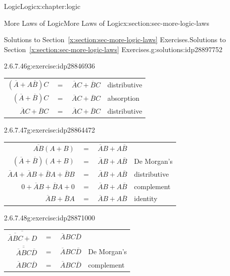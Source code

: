 \documentclass[twoside,10pt,]{book}
\newcommand{\tabularfont}{\relax}
\newcommand{\xreffont}{\relax}
\numberwithin{equation}{section}
\begin{document}
\begin{chapterptx}{Logic}{}{Logic}{}{}{x:chapter:logic}
\begin{sectionptx}{More Laws of Logic}{}{More Laws of Logic}{}{}{x:section:sec-more-logic-laws}
\begin{solutions-subsection}{Solutions to Section~{\xreffont\ref*{x:section:sec-more-logic-laws}} Exercises.}{}{Solutions to Section~{\xreffont\ref*{x:section:sec-more-logic-laws}} Exercises.}{}{}{g:solutions:idp28897752}
\begin{exercisegroup}
\begin{divisionsolutioneg}{2.6.7.46}{}{g:exercise:idp28846936}
\begin{center}
{\begin{tabular}{llll}
\multicolumn{1}{r}{\((\overline{A}{}+A\overline{B}{})C\)}&\(=\)&\(\overline{A}{}C+\overline{B}{}C\)&distributive\tabularnewline[0pt]
\multicolumn{1}{r}{\((\overline{A}{}+\overline{B}{})C\)}&\(=\)&\(\overline{A}{}C+\overline{B}{}C\)&absorption\tabularnewline[0pt]
\multicolumn{1}{r}{\(\overline{A}{}C+\overline{B}{}C\)}&\(=\)&\(\overline{A}{}C+\overline{B}{}C\)&distributive
\end{tabular}
}%
\end{center}%
\end{divisionsolutioneg}%
\begin{divisionsolutioneg}{2.6.7.47}{}{g:exercise:idp28864472}%
\par\smallskip%
\noindent\hypertarget{g:solution:idp28862296-main}{}\begin{center}%
{\tabularfont%
\begin{tabular}{llll}
\multicolumn{1}{r}{\(\overline{AB}(A+B)\)}&\(=\)&\(\overline{A}{}B+A\overline{B}{}\)&\tabularnewline[0pt]
\multicolumn{1}{r}{\((\overline{A}{}+\overline{B}{})(A+B)\)}&\(=\)&\(\overline{A}{}B+A\overline{B}{}\)&De Morgan's\tabularnewline[0pt]
\multicolumn{1}{r}{\(\overline{A}{}A+\overline{A}{}B+\overline{B}{}A+\overline{B}{}B\)}&\(=\)&\(\overline{A}{}B+A\overline{B}{}\)&distributive\tabularnewline[0pt]
\multicolumn{1}{r}{\(0+\overline{A}{}B+\overline{B}{}A+0\)}&\(=\)&\(\overline{A}{}B+A\overline{B}{}\)&complement\tabularnewline[0pt]
\multicolumn{1}{r}{\(\overline{A}{}B+\overline{B}{}A\)}&\(=\)&\(\overline{A}{}B+A\overline{B}{}\)&identity
\end{tabular}
}%
\end{center}%
\end{divisionsolutioneg}%
\begin{divisionsolutioneg}{2.6.7.48}{}{g:exercise:idp28871000}%
\par\smallskip%
\noindent\hypertarget{g:solution:idp28874456-main}{}\begin{center}%
{\tabularfont%
\begin{tabular}{llll}
\multicolumn{1}{r}{\(\overline{\overline{\overline{A}{}BC}+D}\)}&\(=\)&\(\overline{A}{}BC\overline{D}\)&\tabularnewline[0pt]
\multicolumn{1}{r}{\(\overline{\overline{\overline{A}{}BC}}\overline{D}\)}&\(=\)&\(\overline{A}{}BC\overline{D}\)&De Morgan's\tabularnewline[0pt]
\multicolumn{1}{r}{\(\overline{A}{}BC\overline{D}\)}&\(=\)&\(\overline{A}{}BC\overline{D}\)&complement
\end{tabular}
}%
\end{center}%
\end{divisionsolutioneg}%

\end{exercisegroup}
\end{solutions-subsection}
\end{sectionptx}
\end{chapterptx}
\end{document}

